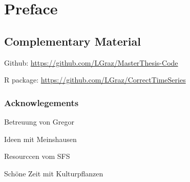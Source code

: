 \chapter*{Preface}

\section*{Complementary Material}


Github: \url{https://github.com/LGraz/MasterThesis-Code} 

R package: \url{https://github.com/LGraz/CorrectTimeSeries } 


\subsection*{Acknowlegements}
Betreuung von Gregor

Ideen mit Meinshausen

Resourccen vom SFS

Schöne Zeit mit Kulturpflanzen

